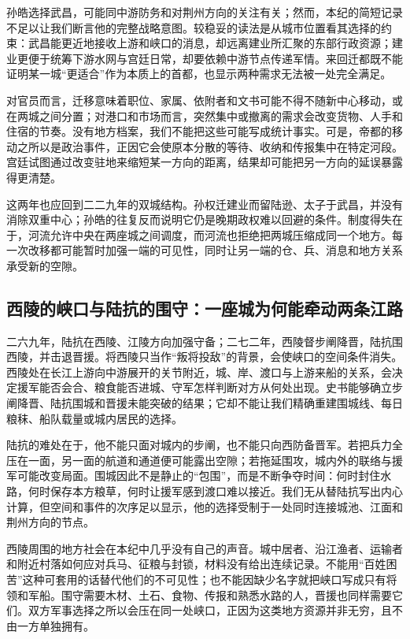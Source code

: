 孙皓选择武昌，可能同中游防务和对荆州方向的关注有关；然而，本纪的简短记录不足以让我们断言他的完整战略意图。较稳妥的读法是从城市位置看其选择的约束：武昌能更近地接收上游和峡口的消息，却远离建业所汇聚的东部行政资源；建业更便于统筹下游水网与宫廷日常，却要依赖中游节点传递军情。来回迁都既不能证明某一城“更适合”作为本质上的首都，也显示两种需求无法被一处完全满足。

对官员而言，迁移意味着职位、家属、依附者和文书可能不得不随新中心移动，或在两城之间分置；对港口和市场而言，突然集中或撤离的需求会改变货物、人手和住宿的节奏。没有地方档案，我们不能把这些可能写成统计事实。可是，帝都的移动之所以是政治事件，正因它会使原本分散的等待、收纳和传报集中在特定河段。宫廷试图通过改变驻地来缩短某一方向的距离，结果却可能把另一方向的延误暴露得更清楚。

这两年也应回到二二九年的双城结构。孙权迁建业而留陆逊、太子于武昌，并没有消除双重中心；孙皓的往复反而说明它仍是晚期政权难以回避的条件。制度得失在于，河流允许中央在两座城之间调度，而河流也拒绝把两城压缩成同一个地方。每一次改移都可能暂时加强一端的可见性，同时让另一端的仓、兵、消息和地方关系承受新的空隙。

\subsection{西陵的峡口与陆抗的围守：一座城为何能牵动两条江路}
\label{reader:wu:xiling}
二六九年，陆抗在西陵、江陵方向加强守备；二七二年，西陵督步阐降晋，陆抗围西陵，并击退晋援。将西陵只当作“叛将投敌”的背景，会使峡口的空间条件消失。西陵处在长江上游向中游展开的关节附近，城、岸、渡口与上游来船的关系，会决定援军能否会合、粮食能否进城、守军怎样判断对方从何处出现。史书能够确立步阐降晋、陆抗围城和晋援未能突破的结果；它却不能让我们精确重建围城线、每日粮秣、船队载量或城内居民的选择。

陆抗的难处在于，他不能只面对城内的步阐，也不能只向西防备晋军。若把兵力全压在一面，另一面的航道和通道便可能露出空隙；若拖延围攻，城内外的联络与援军可能改变局面。围城因此不是静止的“包围”，而是不断争夺时间：何时封住水路，何时保存本方粮草，何时让援军感到渡口难以接近。我们无从替陆抗写出内心计算，但空间和事件的次序足以显示，他的选择受制于一处同时连接城池、江面和荆州方向的节点。

西陵周围的地方社会在本纪中几乎没有自己的声音。城中居者、沿江渔者、运输者和附近村落如何应对兵马、征粮与封锁，材料没有给出连续记录。不能用“百姓困苦”这种可套用的话替代他们的不可见性；也不能因缺少名字就把峡口写成只有将领和军船。围守需要木材、土石、食物、传报和熟悉水路的人，晋援也同样需要它们。双方军事选择之所以会压在同一处峡口，正因为这类地方资源并非无穷，且不由一方单独拥有。

